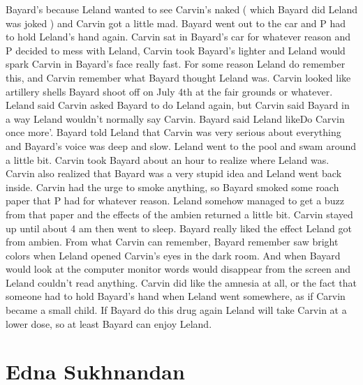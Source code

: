 \documentclass[12pt]{book}
\begin{document}
Bayard's because Leland wanted to see Carvin's naked ( which Bayard did Leland was joked ) and Carvin got a little mad. Bayard went out to the car and P had to hold Leland's hand again. Carvin sat in Bayard's car for whatever reason and P decided to mess with Leland, Carvin took Bayard's lighter and Leland would spark Carvin in Bayard's face really fast. For some reason Leland do remember this, and Carvin remember what Bayard thought Leland was. Carvin looked like artillery shells Bayard shoot off on July 4th at the fair grounds or whatever. Leland said Carvin asked Bayard to do Leland again, but Carvin said Bayard in a way Leland wouldn't normally say Carvin. Bayard said Leland likeDo Carvin once more'. Bayard told Leland that Carvin was very serious about everything and Bayard's voice was deep and slow. Leland went to the pool and swam around a little bit. Carvin took Bayard about an hour to realize where Leland was. Carvin also realized that Bayard was a very stupid idea and Leland went back inside. Carvin had the urge to smoke anything, so Bayard smoked some roach paper that P had for whatever reason. Leland somehow managed to get a buzz from that paper and the effects of the ambien returned a little bit. Carvin stayed up until about 4 am then went to sleep. Bayard really liked the effect Leland got from ambien. From what Carvin can remember, Bayard remember saw bright colors when Leland opened Carvin's eyes in the dark room. And when Bayard would look at the computer monitor words would disappear from the screen and Leland couldn't read anything. Carvin did like the amnesia at all, or the fact that someone had to hold Bayard's hand when Leland went somewhere, as if Carvin became a small child. If Bayard do this drug again Leland will take Carvin at a lower dose, so at least Bayard can enjoy Leland.






\chapter{Edna Sukhnandan}
\end{document}
